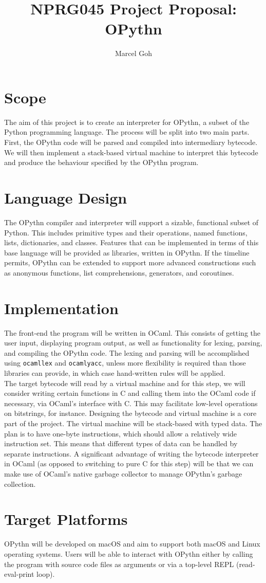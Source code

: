 \documentclass[11pt]{article}
\begin{document}
 
\title{\textbf{NPRG045 Project Proposal: OPythn}}
\author{Marcel Goh}
\maketitle

\section{Scope}
The aim of this project is to create an interpreter for OPythn, a subset of the Python programming language. The process will be split into two main parts. First, the OPythn code will be parsed and compiled into intermediary bytecode. We will then implement a stack-based virtual machine to interpret this bytecode and produce the behaviour specified by the OPythn program.

\section{Language Design}
The OPythn compiler and interpreter will support a sizable, functional subset of Python. This includes primitive types and their operations, named functions, lists, dictionaries, and classes. Features that can be implemented in terms of this base language will be provided as libraries, written in OPythn. If the timeline permits, OPythn can be extended to support more advanced constructions such as anonymous functions, list comprehensions, generators, and coroutines.

\section{Implementation}
The front-end the program will be written in OCaml. This consists of getting the user input, displaying program output, as well as functionality for lexing, parsing, and compiling the OPythn code. The lexing and parsing will be accomplished using \texttt{ocamllex} and \texttt{ocamlyacc}, unless more flexibility is required than those libraries can provide, in which case hand-written rules will be applied.\\
\indent The target bytecode will read by a virtual machine and for this step, we will consider writing certain functions in C and calling them into the OCaml code if necessary, via OCaml's interface with C. This may facilitate low-level operations on bitstrings, for instance. Designing the bytecode and virtual machine is a core part of the project. The virtual machine will be stack-based with typed data. The plan is to have one-byte instructions, which should allow a relatively wide instruction set. This means that different types of data can be handled by separate instructions. A significant advantage of writing the bytecode interpreter in OCaml (as opposed to switching to pure C for this step) will be that we can make use of OCaml's native garbage collector to manage OPythn's garbage collection.

\section{Target Platforms}
OPythn will be developed on macOS and aim to support both macOS and Linux operating systems. Users will be able to interact with OPythn either by calling the program with source code files as arguments or via a top-level REPL (read-eval-print loop).
\end{document}
